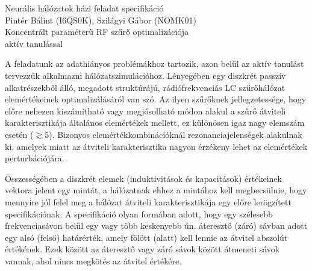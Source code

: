 \documentclass[12pt,a4paper,oneside]{report}
\begin{document}
\begin{center}
	\huge{Neurális hálózatok házi feladat specifikáció} \\
	\vspace*{0.5cm}
	\large{Pintér Bálint (I6QS0K), Szilágyi Gábor (NOMK01)}\\
	\vspace*{0.5cm}
	\Large{Koncentrált paraméterű RF szűrő optimalizációja \\ aktív tanulással}
\end{center}
A feladatunk az adathiányos problémákhoz tartozik, azon belül az aktív tanulást tervezzük alkalmazni hálózatszimulációhoz. Lényegében egy diszkrét passzív alkatrészekből álló, megadott struktúrájú, rádiófrekvenciás LC szűrőhálózat elemértékeinek optimalizálásáról van szó. Az ilyen szűrőknek jellegzetessége, hogy előre nehezen kiszámítható vagy megjósolható módon alakul a szűrő átviteli karakterisztikája általános elemértékek mellett, ez különösen igaz nagy elemszám esetén ($\gtrsim5$). Bizonyos elemértékkombinációknál rezonanciajelenségek alakulnak ki, amelyek miatt az átviteli karakterisztika nagyon érzékeny lehet az elemértékek perturbációjára. 

Összességében a diszkrét elemek (induktivitások és kapacitások) értékeinek vektora jelent egy mintát, a hálózatnak ehhez a mintához kell megbecsülnie, hogy mennyire jól felel meg a hálózat átviteli karakterisztikája egy előre lerögzített specifikációnak. A specifikáció olyan formában adott, hogy egy szélesebb frekvenciasávon belül egy vagy több keskenyebb ún. áteresztő (záró) sávban adott egy alsó (felső) határérték, amely fölött (alatt) kell lennie az átvitel abszolút értékének. Ezek között az áteresztő vagy záró sávok között átmeneti sávok vannak, ahol nincs megkötés az átvitel értékére.
\end{document}
